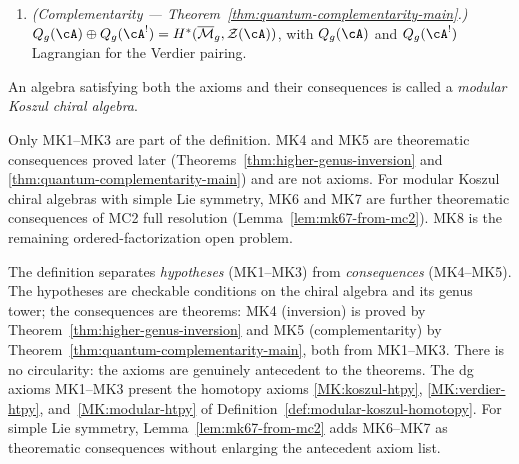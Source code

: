 \begin{definition}
\begin{enumerate}[label=\textup{(MK\arabic*)},start=4]
\item\label{MK:complementarity}
\emph{(Complementarity --- Theorem~\textup{\ref{thm:quantum-complementarity-main}}.)}
$Q_g(\cA) \oplus Q_g(\cA^!) = H^*(\overline{\mathcal{M}}_g, \mathcal{Z}(\cA))$,
with $Q_g(\cA)$ and $Q_g(\cA^!)$ Lagrangian for the Verdier pairing.
\end{enumerate}

An algebra satisfying both the axioms and their consequences is called a
\emph{modular Koszul chiral algebra}.
\end{definition}

\begin{remark}\label{rem:mk-axioms-vs-consequences}
Only MK1--MK3 are part of the definition. MK4 and MK5 are theorematic
consequences proved later (Theorems~\ref{thm:higher-genus-inversion} and
\ref{thm:quantum-complementarity-main}) and are not axioms.  For
modular Koszul chiral algebras with simple Lie symmetry, MK6 and MK7
are further theorematic consequences of MC2 full resolution
(Lemma~\ref{lem:mk67-from-mc2}).  MK8 is the remaining
ordered-factorization open problem.
\end{remark}

\begin{remark}\label{rem:mk-axiom-relations}
The definition separates \emph{hypotheses} (MK1--MK3) from
\emph{consequences} (MK4--MK5).  The hypotheses are
checkable conditions on the chiral algebra and its genus tower;
the consequences are theorems: MK4 (inversion) is proved by Theorem~\ref{thm:higher-genus-inversion} and MK5 (complementarity) by Theorem~\ref{thm:quantum-complementarity-main}, both from MK1--MK3.
There is no circularity: the axioms are genuinely antecedent
to the theorems.  The dg axioms MK1--MK3 present the homotopy axioms
\ref{MK:koszul-htpy}, \ref{MK:verdier-htpy},
and~\ref{MK:modular-htpy} of
Definition~\ref{def:modular-koszul-homotopy}.  For simple Lie
symmetry, Lemma~\ref{lem:mk67-from-mc2} adds MK6--MK7 as theorematic
consequences without enlarging the antecedent axiom list.
\end{remark}

